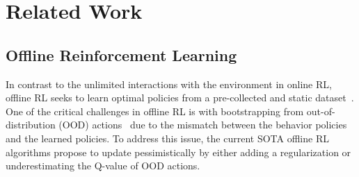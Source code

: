 %
%
\section{Related Work}
\label{appendix_related_work}


\subsection{Offline Reinforcement Learning}
%
In contrast to the unlimited interactions with the environment in online RL, offline RL seeks to learn optimal policies from a pre-collected and static dataset~\citep{fujimoto2019benchmarking, levine2020offline, kumar2020conservative, kostrikov2021offline, chen2024domain}. One of the critical challenges in offline RL is with bootstrapping from out-of-distribution (OOD) actions~\citep{levine2020offline, kumar2020conservative, xu2022policy, liu2024beyond} due to the mismatch between the behavior policies and the learned policies. To address this issue, the current SOTA offline RL algorithms propose to update pessimistically by either adding a regularization or underestimating the Q-value of OOD actions.
%

